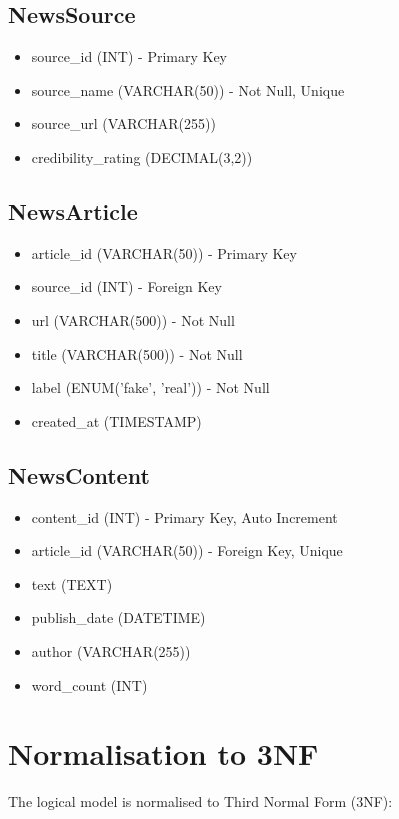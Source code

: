 \documentclass[12pt,a4paper]{report}
\begin{document}
\subsection{NewsSource}
\begin{itemize}
    \item source\_id (INT) - Primary Key
    \item source\_name (VARCHAR(50)) - Not Null, Unique
    \item source\_url (VARCHAR(255))
    \item credibility\_rating (DECIMAL(3,2))
\end{itemize}

\subsection{NewsArticle}
\begin{itemize}
    \item article\_id (VARCHAR(50)) - Primary Key
    \item source\_id (INT) - Foreign Key
    \item url (VARCHAR(500)) - Not Null
    \item title (VARCHAR(500)) - Not Null
    \item label (ENUM('fake', 'real')) - Not Null
    \item created\_at (TIMESTAMP)
\end{itemize}

\subsection{NewsContent}
\begin{itemize}
    \item content\_id (INT) - Primary Key, Auto Increment
    \item article\_id (VARCHAR(50)) - Foreign Key, Unique
    \item text (TEXT)
    \item publish\_date (DATETIME)
    \item author (VARCHAR(255))
    \item word\_count (INT)
\end{itemize}

\section{Normalisation to 3NF}

The logical model is normalised to Third Normal Form (3NF):
\end{document}
